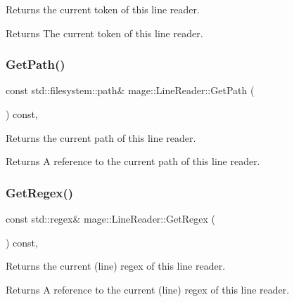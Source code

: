 Returns the current token of this line reader.

\begin{DoxyReturn}{Returns}
The current token of this line reader. 
\end{DoxyReturn}
\mbox{\label{classmage_1_1_line_reader_a9740b3cecdcf5a27c696a08eef3b09da}} 
\subsubsection{\texorpdfstring{Get\+Path()}{GetPath()}}
{\footnotesize\ttfamily const std\+::filesystem\+::path\& mage\+::\+Line\+Reader\+::\+Get\+Path (\begin{DoxyParamCaption}{ }\end{DoxyParamCaption}) const\hspace{0.3cm}{\ttfamily [protected]}, {\ttfamily [noexcept]}}

Returns the current path of this line reader.

\begin{DoxyReturn}{Returns}
A reference to the current path of this line reader. 
\end{DoxyReturn}
\mbox{\label{classmage_1_1_line_reader_a7e4e6f6e41dc07d34ce93022e2f7e401}} 
\subsubsection{\texorpdfstring{Get\+Regex()}{GetRegex()}}
{\footnotesize\ttfamily const std\+::regex\& mage\+::\+Line\+Reader\+::\+Get\+Regex (\begin{DoxyParamCaption}{ }\end{DoxyParamCaption}) const\hspace{0.3cm}{\ttfamily [protected]}, {\ttfamily [noexcept]}}

Returns the current (line) regex of this line reader.

\begin{DoxyReturn}{Returns}
A reference to the current (line) regex of this line reader. 
\end{DoxyReturn}
\mbox{\label{classmage_1_1_line_reader_a2247078d0b5602f9a9a6b74019832faf}} 
